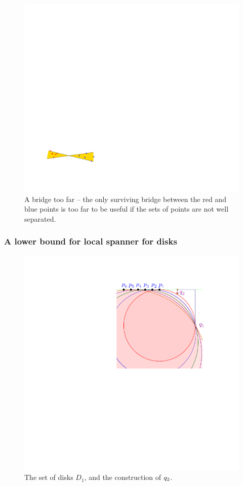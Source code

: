 \documentclass[12pt]{article}%
\begin{document}
\begin{figure}[h]
    \includegraphics[page=3]{figs/bad_example} \hfill%
    \phantom{}
    \caption{A bridge too far -- the only surviving bridge between the
       red and blue points is too far to be useful if the sets of
       points are not well separated.}
\end{figure}



\subsubsection{A lower bound for local spanner for disks}

\begin{figure}[h]
    \centering%
    \includegraphics{figs/lower_bound}%
    \caption{The set of disks $D_1$, and the construction of $q_2$.}
\end{figure}
\end{document}
